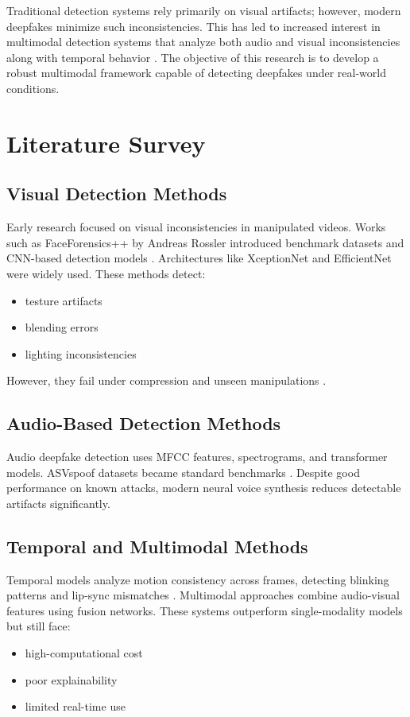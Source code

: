 \documentclass[a4paper, 12pt, oneside]{Thesis}  %
\begin{document}
Traditional detection systems rely primarily on visual artifacts; however, modern deepfakes minimize such inconsistencies. This has led to increased interest in multimodal detection systems that analyze both audio and visual inconsistencies along with temporal behavior \cite{rossler2019faceforensics} \cite{jung2020deepvision}.
The objective of this research is to develop a robust multimodal framework capable of detecting deepfakes under real-world conditions.


\chapter{Literature Survey} 
\label{ch:literature_survey}
\section{Visual Detection Methods}
\label{sec:visual_detection_methods}
Early research focused on visual inconsistencies in manipulated videos. Works such as FaceForensics++ by Andreas Rossler introduced benchmark datasets and CNN-based detection models \cite{rossler2019faceforensics}. Architectures like XceptionNet and EfficientNet were widely used.
These methods detect:
\begin{itemize}
\item testure artifacts
\item blending errors
\item lighting inconsistencies
\end{itemize}

However, they fail under compression and unseen manipulations \cite{li2019deepfake}.

\section{Audio-Based Detection Methods}
\label{sec:audioBased_detection_methods}
Audio deepfake detection uses MFCC features, spectrograms, and transformer models. ASVspoof datasets became standard benchmarks \cite{asvspoof2021}. Despite good performance on known attacks, modern neural voice synthesis reduces detectable artifacts significantly.

\section{Temporal and Multimodal Methods}
\label{sec:temporal_and_multimodal_methods}
Temporal models analyze motion consistency across frames, detecting blinking patterns and lip-sync mismatches \cite{jung2020deepvision}. Multimodal approaches combine audio-visual features using fusion networks.
These systems outperform single-modality models but still face:
\begin{itemize}
\item high-computational cost
\item poor explainability
\item limited real-time use
\end{itemize}
\end{document}
